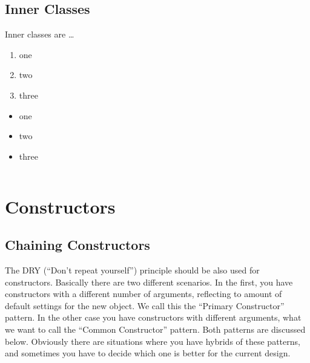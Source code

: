 \begin{lstlisting}[numbers=left]
\end{lstlisting}

\section{Inner Classes}\label{sec:InnerClasses}

Inner classes are …

\begin{enumerate}[label=P\arabic*.]
\item{one}
\item{two}
\item{three}
\end{enumerate}

\begin{itemize}[nosep]
\item{one}
\item{two}
\item{three}
\end{itemize}

\begin{lstlisting}[numbers=left]
\end{lstlisting}

\chapter{Constructors}\label{sec:CodingConstructors}
\section{Chaining Constructors}\label{sec:ChainingConstructors}
The DRY (“Don’t repeat yourself”) principle should be also used for constructors. Basically there are two different scenarios. In the first, you have constructors with a different number of arguments, reflecting to amount of default settings for the new object. We call this the “Primary Constructor” pattern.
In the other case you have constructors with different arguments, what we want to call the “Common Constructor” pattern. Both patterns are discussed below.
Obviously there are situations where you have hybrids of these patterns, and sometimes you have to decide which one is better for the current design.

